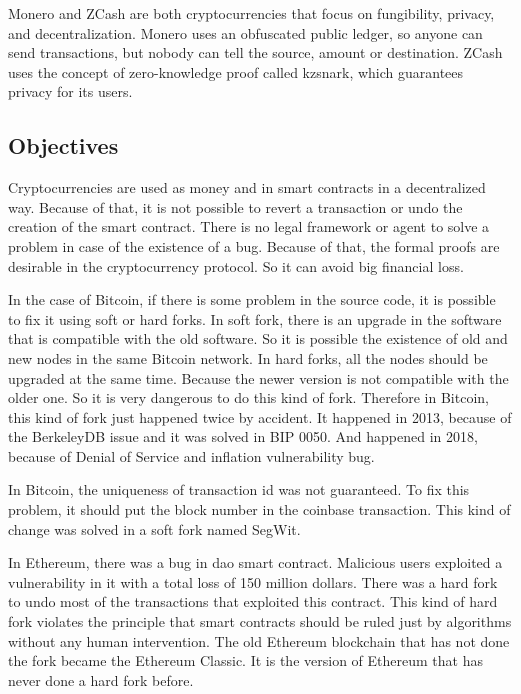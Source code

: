 Monero and ZCash are both cryptocurrencies that focus on fungibility, privacy, and decentralization.
Monero uses an obfuscated public ledger, so anyone can send transactions,
but nobody can tell the source, amount or destination.
ZCash uses the concept of zero-knowledge proof called \gls{kzsnark},
which guarantees privacy for its users.

\subsection{Objectives}

Cryptocurrencies are used as money and in smart contracts in a decentralized way.
Because of that, it is not possible to revert a transaction or undo the creation of the smart contract.
There is no legal framework or agent to solve a problem in case of the existence of a bug.
Because of that, the formal proofs are desirable in the cryptocurrency protocol.
So it can avoid big financial loss.

In the case of Bitcoin, if there is some problem in the source code,
it is possible to fix it using soft or hard forks.
In soft fork, there is an upgrade in the software that is compatible with the old software.
So it is possible the existence of old and new nodes in the same Bitcoin network.
In hard forks, all the nodes should be upgraded at the same time.
Because the newer version is not compatible with the older one.
So it is very dangerous to do this kind of fork.
Therefore in Bitcoin, this kind of fork just happened twice by accident.
It happened in 2013, because of the BerkeleyDB issue and it was solved in BIP 0050.
And happened in 2018, because of Denial of Service and inflation vulnerability bug.

In Bitcoin, the uniqueness of transaction \gls{id} was not guaranteed.
To fix this problem, it should put the block number in the coinbase transaction.
This kind of change was solved in a soft fork named SegWit.

In Ethereum, there was a bug in \gls{dao} smart contract.
Malicious users exploited a vulnerability in it with a
total loss of 150 million dollars.
There was a hard fork to undo most of the transactions that exploited this contract.
This kind of hard fork violates the principle that smart contracts should be ruled just by
algorithms without any human intervention.
The old Ethereum blockchain that has not done the fork became the Ethereum Classic.
It is the version of Ethereum that has never done a hard fork before.

